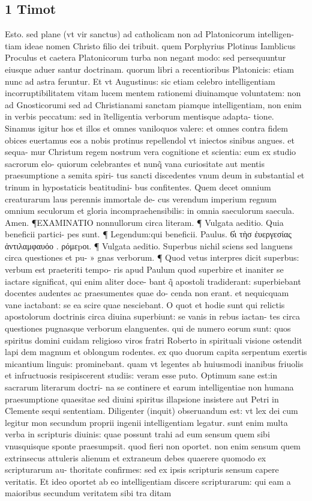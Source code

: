 \documentclass{article}
\begin{document}
\begin{pages}
\section*{1 Timot }
\marginpar{[ p.213 ]}\pstart Esto. sed plane (vt vir sanctus) ad catholicam non ad Platonicorum intelligen- tiam ideae nomen Christo filio dei tribuit. quem Porphyrius Plotinus Iamblicus Proculus et caetera Platonicorum turba non negant modo: sed persequuntur eiusque aduer santur doctrinam. quorum libri a recentioribus Platonicis: etiam nunc ad astra feruntur. Et vt Augustinus: sic etiam celebro intelligentiam incorruptibilitatem vitam lucem mentem rationemi diuinamque voluntatem: non ad Gnosticorumi sed ad Christianami sanctam piamque  intelligentiam, non enim in verbis peccatum: sed in ĩtelligentia verborum mentisque adapta- tione. Sinamus igitur hos et illos et omnes vaniloquos valere: et omnes contra fidem obices euertamus eos a nobis protinus repellendol vt iniectos sinibus angues. et sequa- mur Christum regem nostrum vera cognitione et scientia: eum ex studio sacrorum elo- quiorum celebrantes et nunq̃ vana curiositate aut mentis praesumptione a semita spiri- tus sancti discedentes vnum deum in substantial et trinum in hypostaticis beatitudini- bus confitentes. Quem decet omnium creaturarum laus perennis immortale de- cus verendum imperium regnum omnium seculorum et gloria incompraehensibilis: in omnia saeculorum saecula. Amen.  \pend\pstart *¶EXAMINATIO nonnullorum circa literam. ¶ Vulgata aeditio. Quia beneficii partici- pes sunt. ¶ Legendum:qui beneficii. Paulus. 6̔ι τὴσ ἐυεργεσίας ἀντιλαμφαυόο . ρόμεpοι. ¶ Vulgata aeditio. Superbus nichil sciens sed languens circa questiones et pu- » gnas verborum. ¶ Quod vetus interpres dicit superbus: verbum est praeteriti tempo- ris apud Paulum quod superbire et inaniter se iactare significat, qui enim aliter doce- bant q̃ apostoli tradiderant: superbiebant docentes audentes ac praesumentes quae do- cenda non erant. et nequicquam vane iactabant: se ea scire quae nesciebant. O quot et hodie sunt qui relictis apostolorum doctrinis circa diuina superbiunt: se vanis in rebus iactan- tes circa questiones pugnasque verborum elanguentes. qui de numero eorum sunt: quos spiritus domini cuidam religioso viros fratri Roberto in spirituali visione ostendit lapi dem magnum et oblongum rodentes. ex quo duorum capita serpentum exertis micantium linguis: prominebant. quam vt legentes ab huiusmodi inanibus friuolis et infructuosis resipiscerent studiis: veram esse puto. Optimum sane est:in sacrarum literarum doctri- na se continere et earum intelligentiae non humana praesumptione quaesitae sed diuini spiritus illapsione insistere aut Petri in Clemente sequi sententiam. Diligenter (inquit) obseruandum est: vt lex dei cum legitur mon secundum proprii ingenii intelligentiam legatur. sunt enim multa verba in scripturis diuinis: quae possunt trahi ad eum sensum quem sibi vnusquisque sponte praesumpsit. quod fieri non oportet. non enim sensum quem extrinsecus attuleris alienum et extraneum debes quaerere quomodo ex scripturarum au- thoritate confirmes: sed ex ipsis scripturis sensum capere veritatis. Et ideo oportet ab eo intelligentiam discere scripturarum: qui eam a maioribus secundum veritatem sibi tra ditam 
\end{pages}
\end{document}
